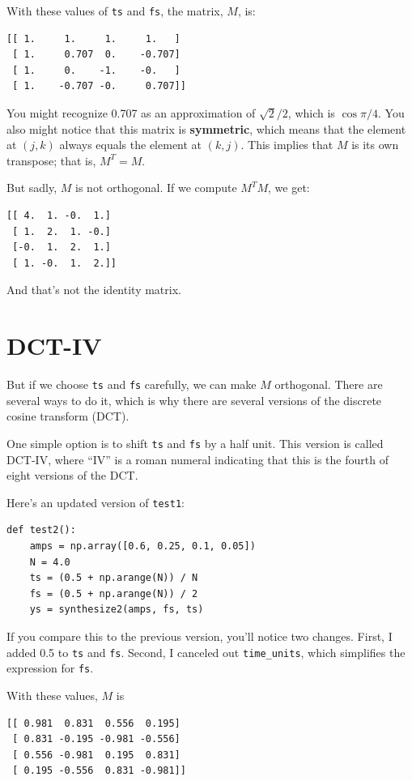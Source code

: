 \documentclass[12pt]{book}
\begin{document}
With these values of {\tt ts} and {\tt fs}, the matrix, $M$, is:

\begin{verbatim}
[[ 1.     1.     1.     1.   ]
 [ 1.     0.707  0.    -0.707]
 [ 1.     0.    -1.    -0.   ]
 [ 1.    -0.707 -0.     0.707]]
\end{verbatim}

You might recognize 0.707 as an approximation of $\sqrt{2}/2$,
which is $\cos \pi/4$.  You also might notice that this matrix
is {\bf symmetric}, which means that the element at $(j, k)$ always
equals the element at $(k, j)$.  This implies that $M$ is its own
transpose; that is, $M^T = M$.

But sadly, $M$ is not orthogonal.  If we compute $M^TM$, we get:

\begin{verbatim}
[[ 4.  1. -0.  1.]
 [ 1.  2.  1. -0.]
 [-0.  1.  2.  1.]
 [ 1. -0.  1.  2.]]
\end{verbatim}

And that's not the identity matrix.


\section{DCT-IV}
\label{dctiv}

But if we choose {\tt ts} and {\tt fs} carefully,
we can make $M$ orthogonal.  There are several ways to do it, which
is why there are several versions of the discrete cosine transform (DCT).

One simple option is to shift {\tt ts} and {\tt fs} by a half unit.
This version is called DCT-IV, where ``IV'' is a roman numeral
indicating that this is the fourth of eight versions of the DCT.

Here's an updated version of {\tt test1}:

\begin{verbatim}
def test2():
    amps = np.array([0.6, 0.25, 0.1, 0.05])
    N = 4.0
    ts = (0.5 + np.arange(N)) / N
    fs = (0.5 + np.arange(N)) / 2
    ys = synthesize2(amps, fs, ts)
\end{verbatim}

If you compare this to the previous version, you'll notice
two changes.  First, I added 0.5 to {\tt ts} and {\tt fs}.
Second, I canceled out \verb"time_units", which simplifies
the expression for {\tt fs}.

With these values, $M$ is

\begin{verbatim}
[[ 0.981  0.831  0.556  0.195]
 [ 0.831 -0.195 -0.981 -0.556]
 [ 0.556 -0.981  0.195  0.831]
 [ 0.195 -0.556  0.831 -0.981]]
\end{verbatim}
\end{document}
